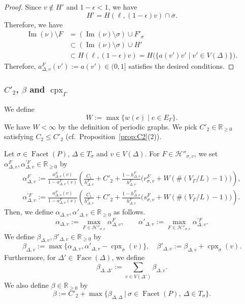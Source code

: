 \begin{proof}
Since $v \not \in H'$ and $1 - \epsilon < 1$, we have 
\[
H' = H(\ell, (1 - \epsilon ) v) \cap \overline{\sigma}. 
\]
Therefore, we have 
\begin{align*}
\operatorname{Im}(\nu) \setminus F 
&= (\operatorname{Im}(\nu) \setminus \sigma) \cup F' _{\sigma} \\
&\subset (\operatorname{Im}(\nu) \setminus \sigma) \cup H' \\
&\subset H(\ell, (1- \epsilon) v) = H \bigl( \{ a(v') v' \mid v' \in V(\Delta) \} \bigr). 
\end{align*}
Therefore, $a^{F} _{\Delta, v} (v') := a(v') \in (0,1]$ satisfies the desired conditions. 
\end{proof}

\subsubsection{$C'_2$, $\beta$ and $\operatorname{cpx}_{\Gamma}$}\label{subsubsection:beta}
We define 
\[
W := \max \{ w(e) \mid e \in E_{\Gamma} \}. 
\]
We have $W  < \infty$ by the definition of periodic graphs. 
We pick $C'_2 \in \mathbb{R}_{\ge 0}$ satisfying $C_2 \le C'_2$ (cf.\ Proposition~\ref{prop:C2}(2)). 

Let $\sigma \in \operatorname{Facet}(P)$, $\Delta \in T_{\sigma}$ and $v \in V(\Delta)$. 
For $F \in \mathcal{H}'' _{\sigma, v}$, we set $\alpha ^{F} _{\Delta, v}, \alpha ^{\prime F} _{\Delta, v} \in \mathbb{R}_{\ge 0}$ by
\begin{align*}
\alpha ^{F} _{\Delta, v} 
:= \frac{a^{F} _{\Delta, v} (v)}{1-a^{F} _{\Delta, v} (v)}
\left( \frac{C_1}{h^F_{\Delta, v}} + C'_2 + \frac{1-h^F_{\Delta, v}}{h^F_{\Delta, v}} \bigl( r^{F} _{\sigma, v} + W ( \#(V_{\Gamma}/L) -1) \bigr) \right), \\
\alpha ^{\prime F} _{\Delta, v} 
:= \frac{a^{F} _{\Delta, v} (v)}{1-a^{F} _{\Delta, v} (v)}
\left( \frac{C_1}{h^F_{\Delta, v}} + C'_2 + \frac{1-h^F_{\Delta, v}}{h^F_{\Delta, v}} \bigl( s^{F} _{\sigma, v} + W(\#(V_{\Gamma}/L) -1) \bigr) \right). 
\end{align*}
Then, we define $\alpha _{\Delta, v}, \alpha ' _{\Delta, v} \in \mathbb{R}_{\ge 0}$ as follows. 
\[
\alpha _{\Delta, v} := \max _{F \in \mathcal{H}'' _{\sigma, v}} \alpha ^{F} _{\Delta, v}, \qquad
\alpha ' _{\Delta, v} := \max _{F \in \mathcal{H}'' _{\sigma, v}} \alpha ^{\prime F} _{\Delta, v}. 
\]
We define $\beta _{\Delta, v}, \beta' _{\Delta, v} \in \mathbb{R}_{\ge 0}$ by
\[
\beta_{\Delta, v} := \max \bigl\{ \alpha _{\Delta, v}, \alpha ' _{\Delta, v} - \operatorname{cpx}_{\sigma}(v) \bigr\}, \quad 
\beta' _{\Delta, v} := \beta_{\Delta, v} + \operatorname{cpx}_{\sigma}(v). 
\]
Furthermore, for $\Delta ' \in \operatorname{Face}(\Delta)$, we define
\[
\beta _{\Delta, \Delta'} := \sum_{v \in V(\Delta ')} \beta _{\Delta, v}.
\]
We also define $\beta \in \mathbb{R}_{\ge 0}$ by
\[
\beta := C' _2 + \max \bigl\{ \beta _{\Delta, \Delta} \ \big | \ \sigma \in \operatorname{Facet}(P),\ \Delta \in T_{\sigma} \bigr \}. 
\]

